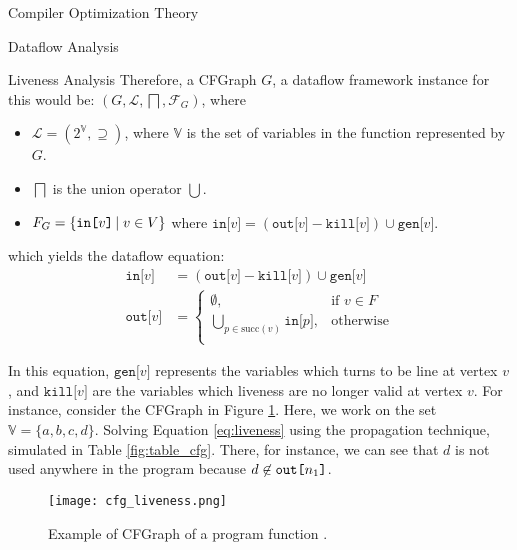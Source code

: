 \begin{section}{Compiler Optimization Theory}
\begin{subsection}{Dataflow Analysis}
\begin{subsubsection}{Liveness Analysis}
Therefore, a CFGraph $G$, a dataflow framework instance for this would be:
$(G, \mathcal{L}, \bigsqcap, \mathcal{F}_G)$, where
\begin{itemize}
	\item $\mathcal{L} = (2^\mathbb{V}, \supseteq)$, where $\mathbb{V}$ is the set of variables in the function represented by $G$.
	\item $\bigsqcap$ is the union operator $\bigcup$.
	\item $F_G = \{\texttt{in[} v \texttt{]}\,|\;v \in V\}$ where
	$\texttt{in[} v \texttt{]} = (\texttt{out[} v \texttt{]} - \texttt{kill[} v \texttt{]}) \cup \texttt{gen[} v \texttt{]}$.
\end{itemize}
which yields the dataflow equation:
\begin{equation}\label{eq:liveness}
\begin{split}
	\texttt{in[} v \texttt{]} &= (\texttt{out[} v \texttt{]} - \texttt{kill[} v \texttt{]}) \cup \texttt{gen[} v \texttt{]} \\
	\texttt{out[} v \texttt{]} &= 
	\begin{cases}
	  \emptyset,& \text{if } v \in F \\
	  \bigcup_{p \in \text{succ}(v)}\texttt{in[}p\texttt{]} ,& \text{otherwise} \\
	\end{cases}
\end{split}
\end{equation}

In this equation, $\texttt{gen[} v \texttt{]}$ represents the variables which turns
to be line at vertex $v$, and $\texttt{kill[} v \texttt{]}$ are the variables which
liveness are no longer valid at vertex $v$. For instance, consider the CFGraph
in Figure \ref{fig:cfg_liveness}. Here, we work on the set $\mathbb{V} = \{a, b, c, d\}$.
Solving Equation \ref{eq:liveness} using the propagation technique, simulated in Table
\ref{fig:table_cfg}. There, for instance, we can see that $d$ is not used anywhere
in the program because $d \not\in \texttt{out[} n_1\texttt{]}$.

\begin{figure}
\centering
	 \texttt{[image: cfg\_liveness.png]}
	  \caption{Example of CFGraph of a program function \citep{khedker2009data}.}
	  \label{fig:cfg_liveness}
\end{figure}


\end{subsubsection}
\end{subsection}
\end{section}
